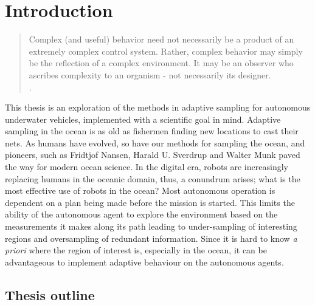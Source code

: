 \chapter{Introduction}

\begin{quote}
    Complex (and useful) behavior need not necessarily be a product of an extremely complex control system. Rather, complex behavior may simply be the reflection of a complex environment. It may be an observer who ascribes complexity to an organism - not necessarily its designer.\\
     \textcite{simon1969sciences}.
\end{quote}


This thesis is an exploration of the methods in adaptive sampling for autonomous underwater vehicles, implemented with a scientific goal in mind. Adaptive sampling in the ocean is as old as fishermen finding new locations to cast their nets. As humans have evolved, so have our methods for sampling the ocean, and pioneers, such as Fridtjof Nansen, Harald U. Sverdrup and Walter Munk paved the way for modern ocean science. In the digital era, robots are increasingly replacing humans in the oceanic domain, thus, a conundrum arises; what is the most effective use of robots in the ocean? Most autonomous operation is dependent on a plan being made before the mission is started. This limits the ability of the autonomous agent to explore the environment based on the measurements it makes along its path leading to under-sampling of interesting regions and oversampling of redundant information. Since it is hard to know \textit{a priori} where the region of interest is, especially in the ocean, it can be advantageous to implement adaptive behaviour on the autonomous agents.



\section{Thesis outline}

